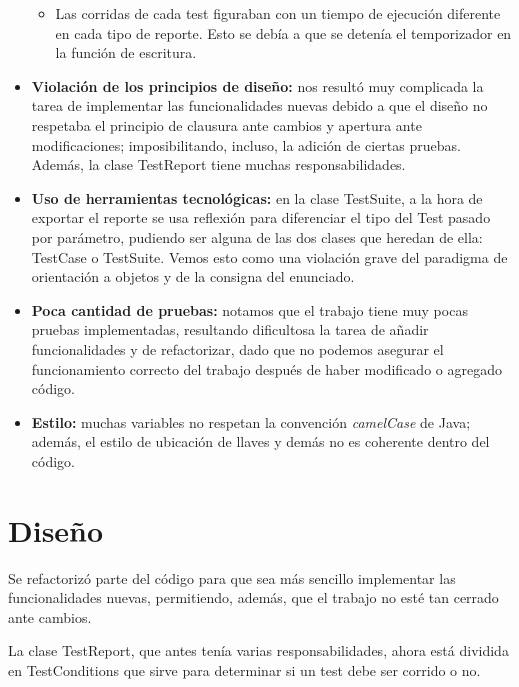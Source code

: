 \documentclass[12pt]{article}
\begin{document}
\begin{itemize}
\begin{itemize}
			\item Las corridas de cada test figuraban con un tiempo de ejecución diferente en cada
				tipo de reporte. Esto se debía a que se detenía el temporizador en la función de
				escritura.

		\end{itemize}	
		
	\item \textbf{Violación de los principios de diseño:} nos resultó muy complicada la tarea de implementar 
		las funcionalidades nuevas debido a que el diseño no respetaba el principio de clausura ante 
		cambios y apertura ante modificaciones; imposibilitando, incluso, la adición de ciertas pruebas. 
		Además, la clase TestReport tiene muchas responsabilidades.	

	\item \textbf{Uso de herramientas tecnológicas:} en la clase TestSuite, a la hora de exportar
		el reporte se usa reflexión para diferenciar el tipo del Test pasado por parámetro,
		pudiendo ser alguna de las dos clases que heredan de ella: TestCase o TestSuite.
		Vemos esto como una violación grave del paradigma de orientación a objetos y de la
		consigna del enunciado.
	
	\item \textbf{Poca cantidad de pruebas:} notamos que el trabajo tiene muy pocas pruebas
		implementadas, resultando dificultosa la tarea de añadir funcionalidades y
		de refactorizar, dado que no podemos asegurar el funcionamiento correcto del trabajo
		después de haber modificado o agregado código.
		
	\item \textbf{Estilo:} muchas variables no respetan la convención \textit{camelCase} 
		de Java; además, el estilo de ubicación de llaves y demás no es coherente dentro del
		código.
		
\end{itemize}


\section{Diseño}
Se refactorizó parte del código para que sea más sencillo implementar las funcionalidades nuevas,
permitiendo, además, que el trabajo no esté tan cerrado ante cambios.

La clase TestReport, que antes tenía varias responsabilidades, ahora está dividida en TestConditions
que sirve para determinar si un test debe ser corrido o no.
\end{document}
